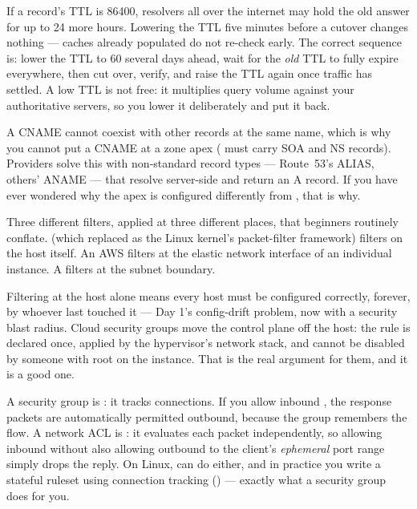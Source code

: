 \begin{secwarn}
If a record's TTL is 86400, resolvers all over the internet may hold the old answer for up to 24 more hours. Lowering the TTL five minutes before a cutover changes nothing --- caches already populated do not re-check early. The correct sequence is: lower the TTL to 60 several days ahead, wait for the \emph{old} TTL to fully expire everywhere, then cut over, verify, and raise the TTL again once traffic has settled. A low TTL is not free: it multiplies query volume against your authoritative servers, so you lower it deliberately and put it back.
\end{secwarn}

\begin{misconception}
A CNAME cannot coexist with other records at the same name, which is why you cannot put a CNAME at a zone apex ( must carry SOA and NS records). Providers solve this with non-standard record types --- Route~53's ALIAS, others' ANAME --- that resolve server-side and return an A record. If you have ever wondered why the apex is configured differently from , that is why.
\end{misconception}


 Three different filters, applied at three different places, that beginners routinely conflate.  (which replaced  as the Linux kernel's packet-filter framework) filters on the host itself. An AWS  filters at the elastic network interface of an individual instance. A  filters at the subnet boundary.

 Filtering at the host alone means every host must be configured correctly, forever, by whoever last touched it --- Day 1's config-drift problem, now with a security blast radius. Cloud security groups move the control plane off the host: the rule is declared once, applied by the hypervisor's network stack, and cannot be disabled by someone with root on the instance. That is the real argument for them, and it is a good one.

 A security group is : it tracks connections. If you allow inbound , the response packets are automatically permitted outbound, because the group remembers the flow. A network ACL is : it evaluates each packet independently, so allowing inbound  without also allowing outbound to the client's \emph{ephemeral} port range simply drops the reply. On Linux,  can do either, and in practice you write a stateful ruleset using connection tracking () --- exactly what a security group does for you.

